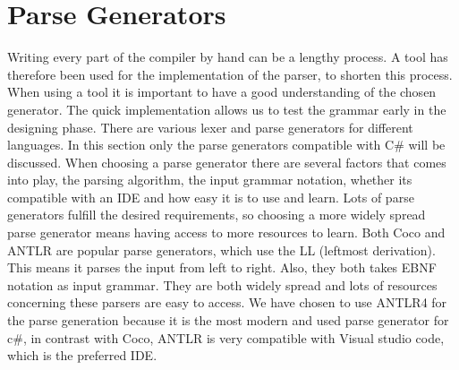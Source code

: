 \section{Parse Generators}
Writing every part of the compiler by hand can be a lengthy process. A tool has therefore been used for the implementation of the parser, to shorten this process. When using a tool it is important to have a good understanding of the chosen generator. The quick implementation allows us to test the grammar early in the designing phase.
There are various lexer and parse generators for different languages. In this section only the parse generators compatible with C# 
will be discussed. When choosing a parse generator there are several factors that comes into play, the parsing algorithm, the input grammar notation,
whether its compatible with an IDE and how easy it is to use and learn. Lots of parse generators fulfill the desired requirements, 
so choosing a more widely spread parse generator means having access to more resources to learn. Both Coco and ANTLR are popular parse generators, which use the LL (leftmost derivation). This means it parses the input from left to right. 
Also, they both takes EBNF notation as input grammar. They are both widely spread and lots of resources concerning these parsers are easy to access. \newline
We have chosen to use ANTLR4 for the parse generation because it is the most modern and used parse generator for c#, in contrast with Coco, ANTLR is very compatible with Visual studio code, which is the preferred IDE. 
